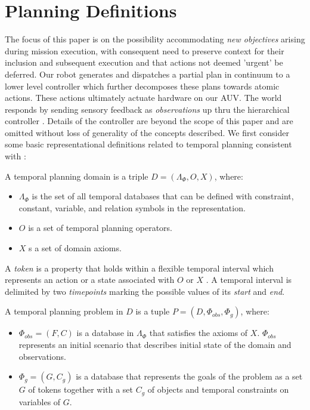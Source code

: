 \section{Planning Definitions}
\label{sec: defs}

The focus of this paper is on the possibility accommodating \emph{new
  objectives} arising during mission execution, with consequent need
to preserve context for their inclusion and subsequent execution and
that actions not deemed 'urgent' be deferred. Our robot generates and
dispatches a partial plan in continuum to a lower level controller
which further decomposes these plans towards atomic actions. These
actions ultimately actuate hardware on our AUV. The world responds by
sending sensory feedback as \emph{observations} up thru the
hierarchical controller \cite{mcgann08bdup,rajan12dup}. Details of the
controller are beyond the scope of this paper and are omitted without
loss of generality of the concepts described. We first consider some
basic representational definitions related to temporal planning
consistent with \cite{Nau:2004}:

\begin{definition}
  \label{def:domain}
  A temporal planning domain is a triple $D = ( \Lambda_\Phi, O, X )$, where:
  \begin{itemize}
  \item $\Lambda_\Phi$ is the set of all temporal databases that can
    be defined with constraint, constant, variable, and relation
    symbols in the representation.
  \item $O$ is a set of temporal planning operators.
  \item $X$ s a set of domain axioms.
  \end{itemize}
\end{definition}

A \emph{token} is a property that holds within a flexible temporal
interval which represents an action or a state associated with $O$ or
$X$ \cite{py10dup}. A temporal interval is delimited by two {\em
  timepoints} \cite{Boddy93} marking the possible values of its {\em
  start} and {\em end}.

\begin{definition}
  \label{def:problem}
  A temporal planning problem in $D$ is a tuple $P = ( D, \Phi_{obs}, \Phi_g )$, where:
  \begin{itemize}
  \item $\Phi_{obs} = (F, C)$ is a database in $\Lambda_\Phi$ that
    satisfies the axioms of $X$.  $\Phi_{obs}$ represents an initial
    scenario that describes initial state of the domain and
    observations.
  \item $\Phi_g = (G, C_g)$ is a database that represents the goals of
    the problem as a set $G$ of tokens together with a set $C_g$ of
    objects  and temporal constraints   on variables of $G$.
  \end{itemize}
\end{definition}

